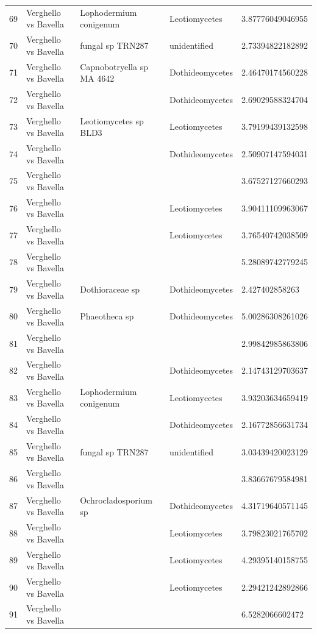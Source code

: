 \documentclass[12pt]{article}\usepackage[]{graphicx}\usepackage[]{color}
\numberwithin{figure}{section}
\begin{document}
\begin{table}[ht]
\begin{tabular}{lllll}
  69 & Verghello vs Bavella & Lophodermium conigenum & Leotiomycetes & 3.87776049046955 \\ 
  70 & Verghello vs Bavella & fungal sp TRN287 & unidentified & 2.73394822182892 \\ 
  71 & Verghello vs Bavella & Capnobotryella sp MA 4642 & Dothideomycetes & 2.46470174560228 \\ 
  72 & Verghello vs Bavella &  & Dothideomycetes & 2.69029588324704 \\ 
  73 & Verghello vs Bavella & Leotiomycetes sp BLD3 & Leotiomycetes & 3.79199439132598 \\ 
  74 & Verghello vs Bavella &  & Dothideomycetes & 2.50907147594031 \\ 
  75 & Verghello vs Bavella &  &  & 3.67527127660293 \\ 
  76 & Verghello vs Bavella &  & Leotiomycetes & 3.90411109963067 \\ 
  77 & Verghello vs Bavella &  & Leotiomycetes & 3.76540742038509 \\ 
  78 & Verghello vs Bavella &  &  & 5.28089742779245 \\ 
  79 & Verghello vs Bavella & Dothioraceae sp & Dothideomycetes & 2.427402858263 \\ 
  80 & Verghello vs Bavella & Phaeotheca sp & Dothideomycetes & 5.00286308261026 \\ 
  81 & Verghello vs Bavella &  &  & 2.99842985863806 \\ 
  82 & Verghello vs Bavella &  & Dothideomycetes & 2.14743129703637 \\ 
  83 & Verghello vs Bavella & Lophodermium conigenum & Leotiomycetes & 3.93203634659419 \\ 
  84 & Verghello vs Bavella &  & Dothideomycetes & 2.16772856631734 \\ 
  85 & Verghello vs Bavella & fungal sp TRN287 & unidentified & 3.03439420023129 \\ 
  86 & Verghello vs Bavella &  &  & 3.83667679584981 \\ 
  87 & Verghello vs Bavella & Ochrocladosporium sp & Dothideomycetes & 4.31719640571145 \\ 
  88 & Verghello vs Bavella &  & Leotiomycetes & 3.79823021765702 \\ 
  89 & Verghello vs Bavella &  & Leotiomycetes & 4.29395140158755 \\ 
  90 & Verghello vs Bavella &  & Leotiomycetes & 2.29421242892866 \\ 
  91 & Verghello vs Bavella &  &  & 6.5282066602472 \\ 

\end{tabular}
\end{table}
\end{document}
